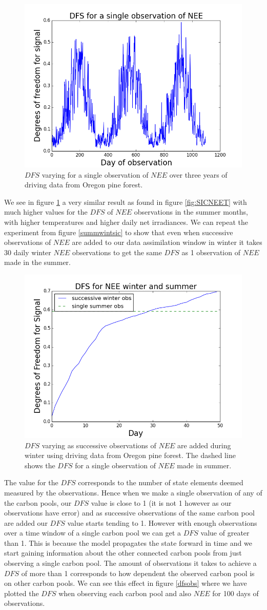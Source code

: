 \documentclass[11pt]{article}
\begin{document}
\begin{figure}[H]
\centering
\includegraphics[height=.33\textwidth]{DFS1Obs_0_1095.png}
\caption{$DFS$ varying for a single observation of $NEE$ over three years of driving data from Oregon pine forest.}
\label{DFS1nee}
\end{figure}

We see in figure \ref{DFS1nee} a very similar result as found in figure \ref{fig:SICNEET} with much higher values for the $DFS$ of $NEE$ observations in the summer months, with higher temperatures and higher daily net irradiances. We can repeat the experiment from figure \ref{summwintsic} to show that even when successive observations of $NEE$ are added to our data assimilation window in winter it takes 30 daily winter $NEE$ observations to get the same $DFS$ as 1 observation of $NEE$ made in the summer.

\begin{figure}[H]
\centering
\includegraphics[height=.34\textwidth]{succwinter_singlesummerdofs.png}
\caption{$DFS$ varying as successive observations of $NEE$ are added during winter using driving data from Oregon pine forest. The dashed line shows the $DFS$ for a single observation of $NEE$ made in summer.}
\label{fig:SIC_subplot}
\end{figure}

The value for the $DFS$ corresponds to the number of state elements deemed measured by the observations. Hence when we make a single observation of any of the carbon pools, our $DFS$ value is close to 1 (it is not 1 however as our observations have error) and as successive observations of the same carbon pool are added our $DFS$ value starts tending to 1. However with enough observations over a time window of a single carbon pool we can get a $DFS$ value of greater than 1. This is because the model propagates the state forward in time and we start gaining information about the other connected carbon pools from just observing a single carbon pool. The amount of observations it takes to achieve a $DFS$ of more than 1 corresponds to how dependent the observed carbon pool is on other carbon pools. We can see this effect in figure \ref{dfsobs} where we have plotted the $DFS$ when observing each carbon pool and also $NEE$ for 100 days of observations.
\end{document}
